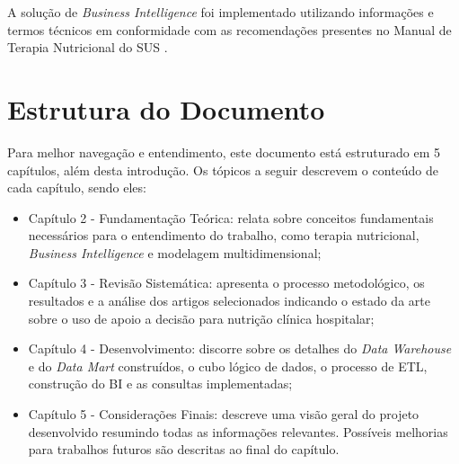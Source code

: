A solução de \textit{Business Intelligence} foi implementado utilizando informações e termos técnicos em conformidade com as recomendações presentes no Manual de Terapia Nutricional do SUS \cite{manualnutricao2016}.

\section{Estrutura do Documento}\label{sec-divisoes}
Para melhor navegação e entendimento, este documento está estruturado em 5 capítulos, além desta introdução. Os tópicos a seguir descrevem o conteúdo de cada capítulo, sendo eles:
\begin{itemize}
 \item Capítulo 2 - Fundamentação Teórica: relata sobre conceitos fundamentais necessários para o entendimento do trabalho, como terapia nutricional, \textit{Business Intelligence} e modelagem multidimensional;

 \item Capítulo 3 - Revisão Sistemática: apresenta o processo metodológico, os resultados e a análise dos artigos selecionados indicando o estado da arte sobre o uso de apoio a decisão para nutrição clínica hospitalar;

 \item Capítulo 4 - Desenvolvimento: discorre sobre os detalhes do \textit{Data Warehouse} e do \textit{Data Mart} construídos, o cubo lógico de dados, o processo de ETL, construção do BI e as consultas implementadas;
 
 \item Capítulo 5 - Considerações Finais: descreve uma visão geral do projeto desenvolvido resumindo todas as informações relevantes. Possíveis melhorias para trabalhos futuros são descritas ao final do capítulo.
\end{itemize}